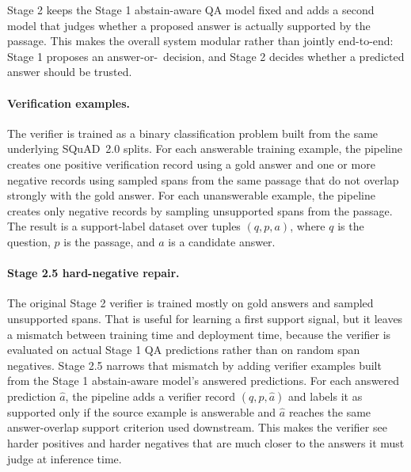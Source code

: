 Stage 2 keeps the Stage 1 abstain-aware QA model fixed and adds a second model
that judges whether a proposed answer is actually supported by the passage.
This makes the overall system modular rather than jointly end-to-end:
Stage 1 proposes an answer-or-\abstain\ decision, and Stage 2 decides whether a
predicted answer should be trusted.

\paragraph{Verification examples.}
The verifier is trained as a binary classification problem built from the same
underlying SQuAD~2.0 splits.
For each answerable training example, the pipeline creates one positive
verification record using a gold answer and one or more negative records using
sampled spans from the same passage that do not overlap strongly with the gold
answer.
For each unanswerable example, the pipeline creates only negative records by
sampling unsupported spans from the passage.
The result is a support-label dataset over tuples
\((q, p, a)\), where \(q\) is the question, \(p\) is the passage, and \(a\) is
a candidate answer.

\paragraph{Stage 2.5 hard-negative repair.}
The original Stage 2 verifier is trained mostly on gold answers and sampled
unsupported spans.
That is useful for learning a first support signal, but it leaves a mismatch
between training time and deployment time, because the verifier is evaluated on
actual Stage 1 QA predictions rather than on random span negatives.
Stage 2.5 narrows that mismatch by adding verifier examples built from the
Stage 1 abstain-aware model's answered predictions.
For each answered prediction \(\hat{a}\), the pipeline adds a verifier record
\((q, p, \hat{a})\) and labels it as supported only if the source example is
answerable and \(\hat{a}\) reaches the same answer-overlap support criterion
used downstream.
This makes the verifier see harder positives and harder negatives that are much
closer to the answers it must judge at inference time.


